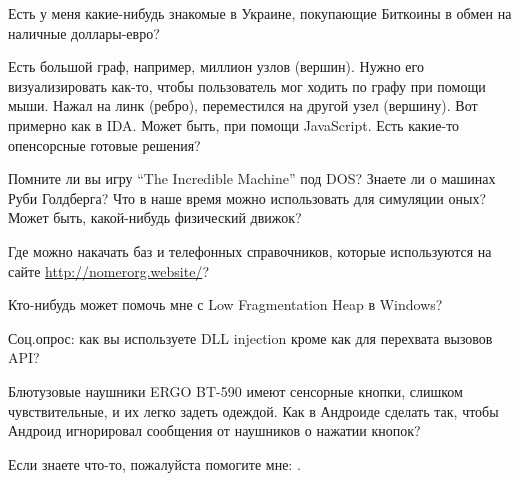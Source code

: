 \myhrule{}

Есть у меня какие-нибудь знакомые в Украине, покупающие Биткоины в обмен на наличные доллары-евро?

\myhrule{}

Есть большой граф, например, миллион узлов (вершин).
Нужно его визуализировать как-то, чтобы пользователь мог ходить по графу при помощи мыши.
Нажал на линк (ребро), переместился на другой узел (вершину).
Вот примерно как в IDA.
Может быть, при помощи JavaScript.
Есть какие-то опенсорсные готовые решения?

\myhrule{}

Помните ли вы игру ``The Incredible Machine'' под DOS?
Знаете ли о машинах Руби Голдберга?
Что в наше время можно использовать для симуляции оных?
Может быть, какой-нибудь физический движок?

\myhrule{}

Где можно накачать баз и телефонных справочников, которые используются на сайте \url{http://nomerorg.website/}?

\myhrule{}

Кто-нибудь может помочь мне с Low Fragmentation Heap в Windows?

\myhrule{}

Соц.опрос: как вы используете DLL injection кроме как для перехвата вызовов API?

\myhrule{}

Блютузовые наушники ERGO BT-590 имеют сенсорные кнопки, слишком чувствительные, и их легко задеть одеждой.
Как в Андроиде сделать так, чтобы Андроид игнорировал сообщения от наушников о нажатии кнопок?

\myhrule{}

Если знаете что-то, пожалуйста помогите мне: \EMAILS{}.


